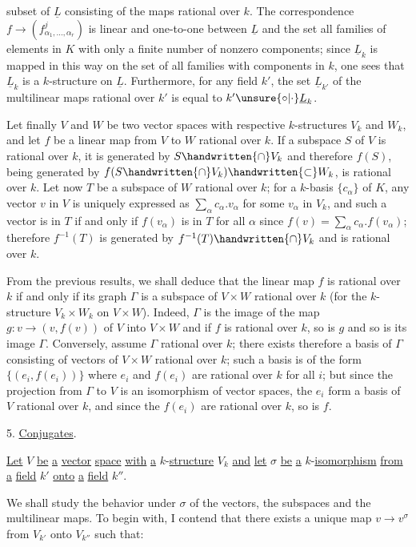 
subset of $\underline L$ consisting of the maps rational over $k$. The correspondence
$f\longrightarrow(f^{j}_{\alpha_1,\ldots,\alpha_r})$ is linear and one-to-one between $\underline L$ and the set all families of
elements in $K$ with only a finite number of nonzero components; since $\underline L_k$ is
mapped in this way on the set of all families with components in $k$, one sees that
$\underline L_k$ is a $k$-structure on $\underline L$. Furthermore, for any field $k'$, the set $\underline L_{k'}$ of the
multilinear maps rational over $k'$ is equal to $k'\unsure{\circ|\cdot}\underline L_k$.

Let finally $V$ and $W$ be two vector spaces with respective $k$-structures
$V_k$ and $W_k$, and let $f$ be a linear map from $V$ to $W$ rational over $k$. If a subspace $S$ of $V$ is rational over $k$, it is generated by $S\handwritten{\cap}V_k$ and therefore $f(S)$,
being generated by $f(S\handwritten{\cap}V_k)\handwritten{\subset}W_k$, is rational over $k$. Let now $T$ be a subspace
of $W$ rational over $k$; for a $k$-basis $\{c_\alpha\}$ of $K$, any vector $v$ in $V$ is uniquely expressed as $\sum_\alpha c_\alpha.v_\alpha$ for some $v_\alpha$ in $V_k$, and such a vector is in $T$ if and only if
$f(v_\alpha)$ is in $T$ for all $\alpha$ since $f(v)=\sum_\alpha c_\alpha.f(v_\alpha)$; therefore $f^{-1}(T)$ is generated by
$f^{-1}(T)\handwritten{\cap}V_k$ and is rational over $k$.

From the previous results, we shall deduce that the linear map $f$ is
rational over $k$ if and only if its graph $\Gamma$ is a subspace of $V\times W$ rational over $k$
(for the $k$-structure $V_k\times W_k$ on $V\times W$). Indeed, $\Gamma$ is the image of the map
$g:v\longrightarrow(v,f(v))$ of $V$ into $V\times W$ and if $f$ is rational over $k$, so is $g$ and so is
its image $\Gamma$. Conversely, assume $\Gamma$ rational over $k$; there exists therefore a
basis of $\Gamma$ consisting of vectors of $V\times W$ rational over $k$; such a basis is of
the form $\{(e_i,f(e_i))\}$ where $e_i$ and $f(e_i)$ are rational over $k$ for all $i$; but since
the projection from $\Gamma$ to $V$ is an isomorphism of vector spaces, the $e_i$ form a
basis of $V$ rational over $k$, and since the $f(e_i)$ are rational over $k$, so is $f$.

5. \uline{Conjugates}.

\uline{Let} $V$ \uline{be} \uline{a} \uline{vector} \uline{space} \uline{with} \uline{a} $k$-\uline{structure} $V_k$ \uline{and} \uline{let} $\sigma$ \uline{be} \uline{a} $k$-\uline{isomorphism}
\uline{from} \uline{a} \uline{field} $k'$ \uline{onto} \uline{a} \uline{field} $k''$.

We shall study the behavior under $\sigma$ of the vectors, the subspaces and the
multilinear maps. To begin with, I contend that there exists a unique map
$v\longrightarrow v^\sigma$ from $V_{k'}$ onto $V_{k''}$ such that:
